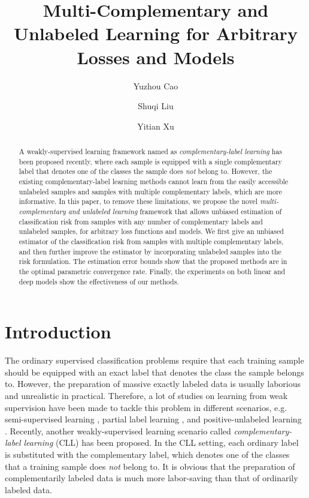 \documentclass[]{article} \usepackage{geometry}
\title{Multi-Complementary and Unlabeled Learning for Arbitrary Losses and Models}
\author[1]{Yuzhou Cao}
\author[1]{Shuqi Liu}
\author[1]{Yitian Xu}
\affil[1]{College of Science, China Agricultural University}
\date{}
\begin{document}
\maketitle
\begin{abstract}
A weakly-supervised learning framework named as \textit{complementary-label learning} has been proposed recently, where each sample is equipped with a single complementary label that denotes one of the classes the sample does \textit{not} belong to. However, the existing complementary-label learning methods cannot learn from the easily accessible unlabeled samples and samples with multiple complementary labels, which are more informative. In this paper, to remove these limitations, we propose the novel \textit{multi-complementary and unlabeled learning} framework that allows unbiased estimation of classification risk from samples with any number of complementary labels and unlabeled samples, for arbitrary loss functions and models. We first give an unbiased estimator of the classification risk from samples with multiple complementary labels, and then further improve the estimator by incorporating unlabeled samples into the risk formulation. The estimation error bounds show that the proposed methods are in the optimal parametric convergence rate. Finally, the experiments on both linear and deep models show the effectiveness of our methods.
\end{abstract}

\section{Introduction}
The ordinary supervised classification problems require that each training sample should be equipped with an exact label that denotes the class the sample belongs to. However, the preparation of massive exactly labeled data is usually laborious and unrealistic in practical. Therefore, a lot of studies on learning from weak supervision have been made to tackle this problem in different scenarios, e.g. semi-supervised learning \cite{DBLP:books/mit/06/CSZ2006,DBLP:conf/icml/SakaiPNS17,DBLP:conf/ijcai/ZhangZ18,SSL1,SSL2}, partial label learning \cite{DBLP:journals/jmlr/CourST11,DBLP:journals/tkde/ZhangYT17}, and positive-unlabeled learning \cite{DBLP:conf/kdd/ElkanN08,DBLP:conf/icml/PlessisNS15,DBLP:journals/pami/SansoneNZ19,DBLP:conf/icml/HsiehNS19}. Recently, another weakly-supervised learning scenario called \textit{complementary-label learning} (CLL) has been proposed. In the CLL setting, each ordinary label is substituted with the complementary label, which denotes one of the classes that a training sample does \textit{not} belong to. It is obvious that the preparation of complementarily labeled data is much more labor-saving than that of ordinarily labeled data.
\end{document}
